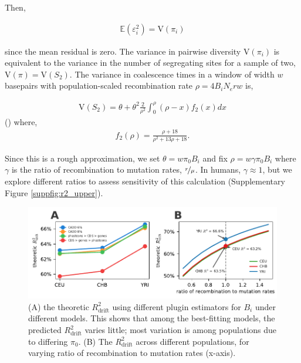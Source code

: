 \documentclass[11pt]{article}
\newcommand{\E}{\mathbb{E}}
\newcommand{\V}{\text{V}}
\begin{document}
Then, 

\begin{align}
    \E(\varepsilon_i^2) = \V(\pi_i)
\end{align}

since the mean residual is zero. The variance in pairwise diversity
$\V(\pi_i)$ is equivalent to the variance in the number of segregating sites
for a sample of two, $\V(\pi) = \V(S_2)$. The variance in coalescence times
in a window of width $w$ basepairs with population-scaled recombination rate
$\rho = 4 B_i N_e r w$ is,

\begin{align}
    \V(S_2) = \theta + \theta^2 \frac{2}{\rho^2} \int_0^\rho (\rho - x) f_2(x) dx
\end{align}
(\cite[eq. 7.20]{Wakeley2009-ua}) where,
\begin{align}
    f_2(\rho) = \frac{\rho + 18}{\rho^2 + 13 \rho + 18}.
\end{align}

Since this is a rough approximation,  we set $\theta = w \pi_0 B_i$ and fix
$\rho = w \gamma \pi_0 B_i$ where $\gamma$ is the ratio of recombination to
mutation rates, $\nicefrac{r}{\mu}$. In humans, $\gamma \approx 1$, but we
explore different ratios to assess sensitivity of this calculation
(Supplementary Figure \ref{suppfig:r2_upper}). 

\begin{figure}[htbp] \centering
    \includegraphics[width=\textwidth]{figures/supplementary/suppfigure_drift_R2.pdf}
    \caption{(A) the theoretic $R_\text{drift}^2$ using different plugin
        estimators for $B_i$ under different models. This shows that among the
        best-fitting models, the predicted $R_\text{drift}^2$ varies little;
        most variation is among populations due to differing $\pi_0$. (B) The 
        $R_\text{drift}^2$ across different populations, for varying ratio of recombination
        to mutation rates (x-axis).}
  \label{suppfig:drift_r2}
\end{figure}
\end{document}
